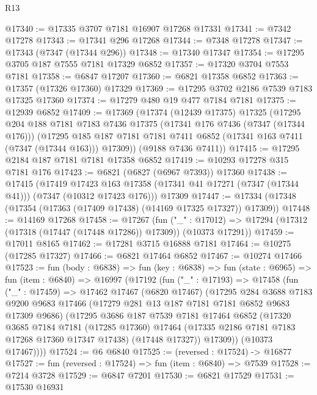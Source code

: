 \begin{lexlean}{R13}
\begin{coremodule}
@17340 := @17335 @3707 @7181 @16907 @17268 @17331
@17341 := @7342 @17278
@17343 := @17341 @296 @17268
@17344 := @7348 @17278
@17347 := @17343 (@7347 (@17344 @296))
@17348 := @17340 @17347
@17354 := @17295 @3705 @187 @7555 @7181 @17329 @6852
@17357 := @17320 @3704 @7553 @7181
@17358 := @6847 @17207
@17360 := @6821 @17358 @6852
@17363 := @17357 (@17326 @17360) @17329
@17369 := @17295 @3702 @2186 @7539 @7183 @17325 @17360
@17374 := @17279 @480 @19 @477 @7184 @7181
@17375 := @12939 @6852
@17409 := @17369
    (@17374
      (@12439 @17375)
      @17325
      (@17295
        @204
        @188
        @7181
        @7183
        @7436
        @17375
        (@17341 @176 @7436 (@7347 (@17344 @176)))
        (@17295 @185 @187 @7181 @7181 @7411 @6852 (@17341 @163 @7411 (@7347 (@17344 @163))) @17309))
      (@9188 @7436 @7411))
@17415 := @17295 @2184 @187 @7181 @7181 @17358 @6852
@17419 := @10293 @17278 @315 @7181 @176
@17423 := @6821 (@6827 (@6967 @7393)) @17360
@17438 := @17415
    (@17419
      @17423
      @163
      @17358
      (@17341 @41 @17271 (@7347 (@17344 @41)))
      (@7347 (@10312 @17423 @176)))
    @17309
@17447 := @17334 (@17348 (@17354 (@17363 (@17409 @17438) (@14169 @17325 @17327)) @17309))
@17448 := @14169 @17268
@17458 := @17267
    (fun ("_" : @17012) => @17294 (@17312 (@17318 (@17447 (@17448 @17286)) @17309)) (@10373 @17291))
@17459 := @17011 @8165
@17462 := @17281 @3715 @16888 @7181
@17464 := @10275 (@17285 @17327)
@17466 := @6821 @17464 @6852
@17467 := @10274 @17466
@17523 := fun (body : @6838) =>
  fun (key : @6838) =>
  fun (state : @6965) =>
  fun (item : @6840) =>
  @16997
    (@17192
      (fun ("_" : @17193) =>
      @17458
        (fun ("_" : @17459) =>
        @17462
          @17467
          (@6820 @17467)
          (@17295
            @284
            @3688
            @7183
            @9200
            @9683
            @17466
            (@17279 @281 @13 @187 @7181 @7181 @6852 @9683 @17309 @9686)
            (@17295
              @3686
              @187
              @7539
              @7181
              @17464
              @6852
              (@17320
                @3685
                @7184
                @7181
                (@17285 @17360)
                @17464
                (@17335 @2186 @7181 @7183 @17268 @17360 @17347 @17438)
                (@17448 @17327))
              @17309))
          (@10373 @17467))))
@17524 := @6 @6840
@17525 := (reversed : @17524) -> @16877
@17527 := fun (reversed : @17524) => fun (item : @6840) => @7539
@17528 := @7214 @3728
@17529 := @6847 @7201
@17530 := @6821 @17529
@17531 := @17530 @16931

\end{coremodule}
\end{lexlean}
